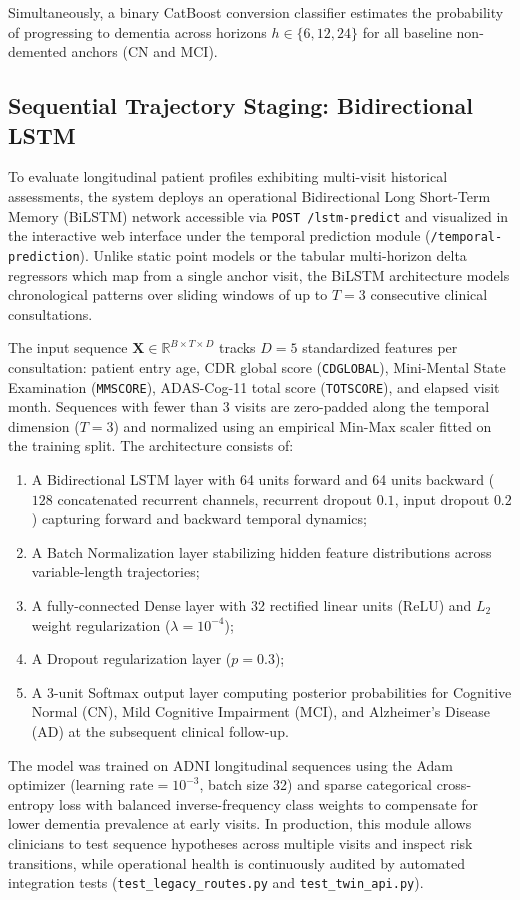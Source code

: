 \documentclass[11pt,a4paper]{article}
\begin{document}
Simultaneously, a binary CatBoost conversion classifier estimates the probability of progressing to dementia across horizons $h \in \{6, 12, 24\}$ for all baseline non-demented anchors (CN and MCI).

\subsection{Sequential Trajectory Staging: Bidirectional LSTM}
To evaluate longitudinal patient profiles exhibiting multi-visit historical assessments, the system deploys an operational Bidirectional Long Short-Term Memory (BiLSTM) network accessible via \texttt{POST /lstm-predict} and visualized in the interactive web interface under the temporal prediction module (\texttt{/temporal-prediction}). Unlike static point models or the tabular multi-horizon delta regressors which map from a single anchor visit, the BiLSTM architecture models chronological patterns over sliding windows of up to $T = 3$ consecutive clinical consultations.

The input sequence $\mathbf{X} \in \mathbb{R}^{B \times T \times D}$ tracks $D = 5$ standardized features per consultation: patient entry age, CDR global score (\texttt{CDGLOBAL}), Mini-Mental State Examination (\texttt{MMSCORE}), ADAS-Cog-11 total score (\texttt{TOTSCORE}), and elapsed visit month. Sequences with fewer than 3 visits are zero-padded along the temporal dimension ($T=3$) and normalized using an empirical Min-Max scaler fitted on the training split. The architecture consists of:
\begin{enumerate}
    \item A Bidirectional LSTM layer with 64 units forward and 64 units backward ($128$ concatenated recurrent channels, recurrent dropout $0.1$, input dropout $0.2$) capturing forward and backward temporal dynamics;
    \item A Batch Normalization layer stabilizing hidden feature distributions across variable-length trajectories;
    \item A fully-connected Dense layer with 32 rectified linear units (ReLU) and $L_2$ weight regularization ($\lambda = 10^{-4}$);
    \item A Dropout regularization layer ($p = 0.3$);
    \item A 3-unit Softmax output layer computing posterior probabilities for Cognitive Normal (CN), Mild Cognitive Impairment (MCI), and Alzheimer's Disease (AD) at the subsequent clinical follow-up.
\end{enumerate}
The model was trained on ADNI longitudinal sequences using the Adam optimizer ($\text{learning rate} = 10^{-3}$, batch size 32) and sparse categorical cross-entropy loss with balanced inverse-frequency class weights to compensate for lower dementia prevalence at early visits. In production, this module allows clinicians to test sequence hypotheses across multiple visits and inspect risk transitions, while operational health is continuously audited by automated integration tests (\texttt{test\_legacy\_routes.py} and \texttt{test\_twin\_api.py}).
\end{document}
